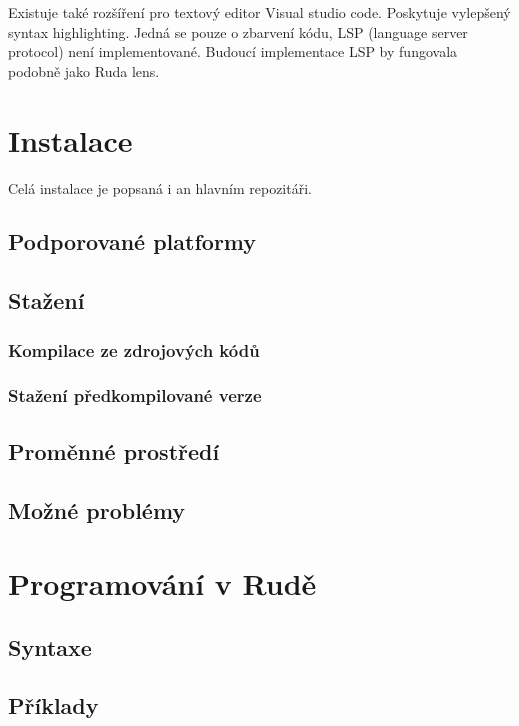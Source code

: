 \documentclass[12pt, a4paper,
twoside,        %
openright
]{report}
\let\oldchapter\chapter
\renewcommand{\chapter}{
	\clearpage
	\pagestyle{fancy}
	\oldchapter
}
\begin{document}
Existuje také rozšíření pro textový editor Visual studio code. Poskytuje vylepšený syntax highlighting. Jedná se pouze o zbarvení kódu, LSP (language server protocol) není implementované. Budoucí implementace LSP by fungovala podobně jako Ruda lens.

\chapter{Instalace}

Celá instalace je popsaná i an hlavním repozitáři.

\section{Podporované platformy}

\section{Stažení}

\subsection{Kompilace ze zdrojových kódů}

\subsection{Stažení předkompilované verze}

\section{Proměnné prostředí}

\section{Možné problémy}

\chapter{Programování v Rudě}

\section{Syntaxe}

\section{Příklady}
\end{document}
